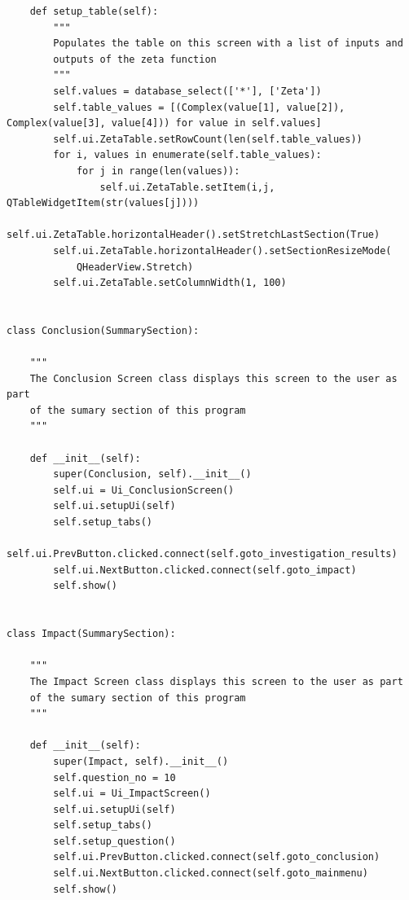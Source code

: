 \documentclass[12pt]{article}
\begin{document}
\begin{lstlisting}
    def setup_table(self):
        """
        Populates the table on this screen with a list of inputs and
        outputs of the zeta function
        """
        self.values = database_select(['*'], ['Zeta'])
        self.table_values = [(Complex(value[1], value[2]), Complex(value[3], value[4])) for value in self.values]
        self.ui.ZetaTable.setRowCount(len(self.table_values))
        for i, values in enumerate(self.table_values):
            for j in range(len(values)):
                self.ui.ZetaTable.setItem(i,j, QTableWidgetItem(str(values[j])))
        self.ui.ZetaTable.horizontalHeader().setStretchLastSection(True)
        self.ui.ZetaTable.horizontalHeader().setSectionResizeMode(
            QHeaderView.Stretch)
        self.ui.ZetaTable.setColumnWidth(1, 100)


class Conclusion(SummarySection):

    """
    The Conclusion Screen class displays this screen to the user as part
    of the sumary section of this program
    """

    def __init__(self):
        super(Conclusion, self).__init__()
        self.ui = Ui_ConclusionScreen()
        self.ui.setupUi(self)
        self.setup_tabs()
        self.ui.PrevButton.clicked.connect(self.goto_investigation_results)
        self.ui.NextButton.clicked.connect(self.goto_impact)
        self.show()


class Impact(SummarySection):

    """
    The Impact Screen class displays this screen to the user as part
    of the sumary section of this program
    """

    def __init__(self):
        super(Impact, self).__init__()
        self.question_no = 10
        self.ui = Ui_ImpactScreen()
        self.ui.setupUi(self)
        self.setup_tabs()
        self.setup_question()
        self.ui.PrevButton.clicked.connect(self.goto_conclusion)
        self.ui.NextButton.clicked.connect(self.goto_mainmenu)
        self.show()
\end{lstlisting}
\end{document}
